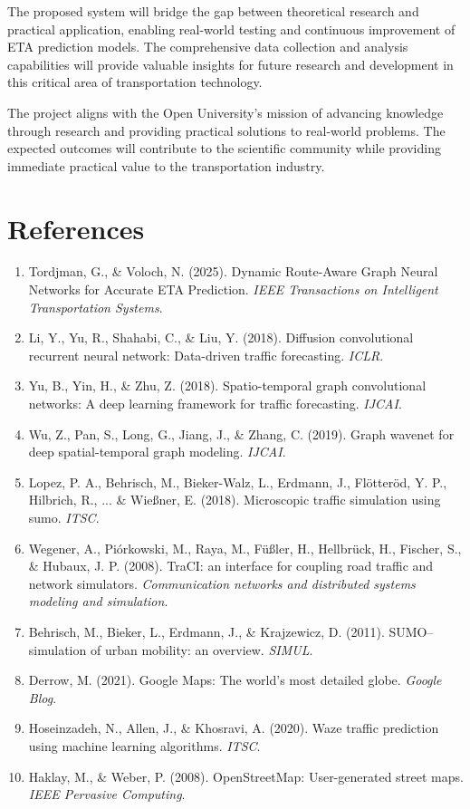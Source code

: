 \documentclass[12pt,a4paper]{article}
\begin{document}
The proposed system will bridge the gap between theoretical research and practical application, enabling real-world testing and continuous improvement of ETA prediction models. The comprehensive data collection and analysis capabilities will provide valuable insights for future research and development in this critical area of transportation technology.

The project aligns with the Open University's mission of advancing knowledge through research and providing practical solutions to real-world problems. The expected outcomes will contribute to the scientific community while providing immediate practical value to the transportation industry.

\section{References}

\begin{enumerate}
    \item Tordjman, G., \& Voloch, N. (2025). Dynamic Route-Aware Graph Neural Networks for Accurate ETA Prediction. \textit{IEEE Transactions on Intelligent Transportation Systems}.
    \item Li, Y., Yu, R., Shahabi, C., \& Liu, Y. (2018). Diffusion convolutional recurrent neural network: Data-driven traffic forecasting. \textit{ICLR}.
    \item Yu, B., Yin, H., \& Zhu, Z. (2018). Spatio-temporal graph convolutional networks: A deep learning framework for traffic forecasting. \textit{IJCAI}.
    \item Wu, Z., Pan, S., Long, G., Jiang, J., \& Zhang, C. (2019). Graph wavenet for deep spatial-temporal graph modeling. \textit{IJCAI}.
    \item Lopez, P. A., Behrisch, M., Bieker-Walz, L., Erdmann, J., Flötteröd, Y. P., Hilbrich, R., ... \& Wießner, E. (2018). Microscopic traffic simulation using sumo. \textit{ITSC}.
    \item Wegener, A., Piórkowski, M., Raya, M., Füßler, H., Hellbrück, H., Fischer, S., \& Hubaux, J. P. (2008). TraCI: an interface for coupling road traffic and network simulators. \textit{Communication networks and distributed systems modeling and simulation}.
    \item Behrisch, M., Bieker, L., Erdmann, J., \& Krajzewicz, D. (2011). SUMO–simulation of urban mobility: an overview. \textit{SIMUL}.
    \item Derrow, M. (2021). Google Maps: The world's most detailed globe. \textit{Google Blog}.
    \item Hoseinzadeh, N., Allen, J., \& Khosravi, A. (2020). Waze traffic prediction using machine learning algorithms. \textit{ITSC}.
    \item Haklay, M., \& Weber, P. (2008). OpenStreetMap: User-generated street maps. \textit{IEEE Pervasive Computing}.
\end{enumerate}
\end{document}
